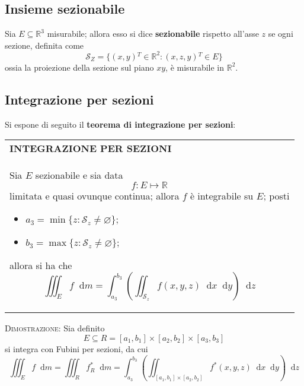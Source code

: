 \documentclass[a4paper]{extarticle}
\renewcommand\arraystretch{}
\newcommand*\dif{\mathop{}\!\mathrm{d}}
\begin{document}
\vspace{1em}
\noindent
\subsection{Insieme sezionabile}
Sia $E \subseteq \mathbb{R}^3$ misurabile; allora esso si dice \textbf{sezionabile} rispetto all'asse $z$ se ogni sezione, definita come
\[\mathcal{S}_Z = \{(x,y){^T} \in \mathbb{R}^2 : (x,z,y){^T} \in E\}\]
ossia la proiezione della sezione sul piano $xy$, è misurabile in $\mathbb{R}^2$.

\vspace{1em}
\noindent
\subsection{Integrazione per sezioni}
Si espone di seguito il \textbf{teorema di integrazione per sezioni}:

\vspace{1em}
\setlength{\tabcolsep}{14pt}
\renewcommand{\arraystretch}{2}
\noindent
\begin{tabularx}{\textwidth}{@{}|P|@{}}
    \hline
    {\textbf{INTEGRAZIONE PER SEZIONI}}\\
    \parbox{\linewidth}{Sia $E$ sezionabile e sia data
    \[f : E \longmapsto \mathbb{R}\]
    limitata e quasi ovunque continua; allora $f$ è integrabile su $E$; posti
    \begin{itemize}
        \item $a_3 = \min \{z : \mathcal{S}_z \neq \varnothing\}$;
        \item $b_3 = \max \{z : \mathcal{S}_z \neq \varnothing\}$;
    \end{itemize}
    allora si ha che
    \[\iiint_E f \dif m = \int_{a_3}^{b_3} \left(\iint_{\mathcal{S}_z} f(x,y,z) \dif x \dif y\right) \dif z\]
    \vspace{-1mm}}\\
    \hline
\end{tabularx}

\vspace{2em}
\noindent
\normalfont \normalsize
\textsc{Dimostrazione}: Sia definito
\[E \subseteq R = [a_1,b_1] \times [a_2,b_2] \times [a_3,b_3]\]
si integra con Fubini per sezioni, da cui
\[\iiint_E f \dif m = \iiint_R f^*_R \dif m = \int_{a_3}^{b_3} \left(\iint_{[a_1,b_1] \times [a_2,b_2]} f^*(x,y,z) \dif x \dif y\right) \dif z\]
\end{document}
